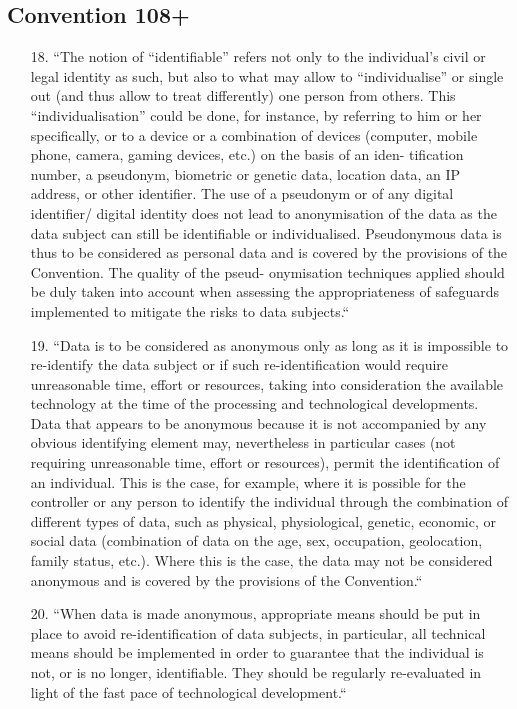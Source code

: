 \documentclass[aps,prb,twocolumn,superscriptaddress,floatfix,longbibliography,nofootinbib]{revtex4-2}
\begin{document}
  \subsection{\label{subsec:Conv108}Convention 108+}
    \begin{enumerate}
      \item[18.] ``The notion of “identifiable” refers not only to the
    individual’s civil or legal identity as such, but also to
    what may allow to “individualise” or single out (and
    thus allow to treat differently) one person from others.
    This “individualisation” could be done, for instance, by
    referring to him or her specifically, or to a device or
    a combination of devices (computer, mobile phone,
    camera, gaming devices, etc.) on the basis of an iden-
    tification number, a pseudonym, biometric or genetic
    data, location data, an IP address, or other identifier.
    The use of a pseudonym or of any digital identifier/
    digital identity does not lead to anonymisation of 
    the data as the data subject can still be identifiable
    or individualised. Pseudonymous data is thus to be
    considered as personal data and is covered by the
    provisions of the Convention. The quality of the pseud-
    onymisation techniques applied should be duly taken
    into account when assessing the appropriateness of
    safeguards implemented to mitigate the risks to data
    subjects.``

    \item[19.] ``Data is to be considered as anonymous only as
    long as it is impossible to re-identify the data subject
    or if such re-identification would require unreasonable
    time, effort or resources, taking into consideration the
    available technology at the time of the processing
    and technological developments. Data that appears
    to be anonymous because it is not accompanied by
    any obvious identifying element may, nevertheless
    in particular cases (not requiring unreasonable time,
    effort or resources), permit the identification of an
    individual. This is the case, for example, where it is
    possible for the controller or any person to identify
    the individual through the combination of different
    types of data, such as physical, physiological, genetic,
    economic, or social data (combination of data on the
    age, sex, occupation, geolocation, family status, etc.).
    Where this is the case, the data may not be considered
    anonymous and is covered by the provisions of the
    Convention.``

    \item[20.] ``When data is made anonymous, appropriate
    means should be put in place to avoid re-identification
    of data subjects, in particular, all technical means
    should be implemented in order to guarantee that
    the individual is not, or is no longer, identifiable. They
    should be regularly re-evaluated in light of the fast
    pace of technological development.``\cite{Conv108+}
    \end{enumerate}
    
\end{document}
